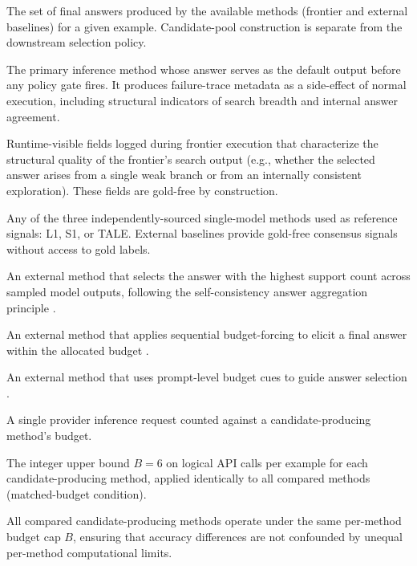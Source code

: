 \begin{description}[leftmargin=2.2cm, labelwidth=2cm, labelsep=0.2cm, style=nextline]
  \item[Candidate pool] The set of final answers produced by the available
    methods (frontier and external baselines) for a given example.
    Candidate-pool construction is separate from the downstream selection
    policy.
  \item[Frontier method] The primary inference method whose answer serves as
    the default output before any policy gate fires.
    It produces failure-trace metadata as a side-effect of normal execution,
    including structural indicators of search breadth and internal answer
    agreement.
  \item[Failure-trace metadata] Runtime-visible fields logged during frontier
    execution that characterize the structural quality of the frontier's
    search output (e.g., whether the selected answer arises from a single weak
    branch or from an internally consistent exploration).
    These fields are gold-free by construction.
  \item[External baseline] Any of the three independently-sourced single-model
    methods used as reference signals: L1, S1, or TALE.
    External baselines provide gold-free consensus signals without access to
    gold labels.
  \item[L1] An external method that selects the answer with the highest support
    count across sampled model outputs, following the self-consistency answer
    aggregation principle \citep{wang2023selfconsistency}.
  \item[S1] An external method that applies sequential budget-forcing to elicit
    a final answer within the allocated budget \citep{muennighoff2025s1}.
  \item[TALE] An external method that uses prompt-level budget cues to guide
    answer selection \citep{han2025token}.
  \item[Logical API call] A single provider inference request counted against a
    candidate-producing method's budget.
  \item[Budget] The integer upper bound $B = 6$ on logical API calls per
    example for each candidate-producing method, applied identically to all
    compared methods (matched-budget condition).
  \item[Matched budget] All compared candidate-producing methods operate under
    the same per-method budget cap $B$, ensuring that accuracy differences are
    not confounded by unequal per-method computational limits.

\end{description}
